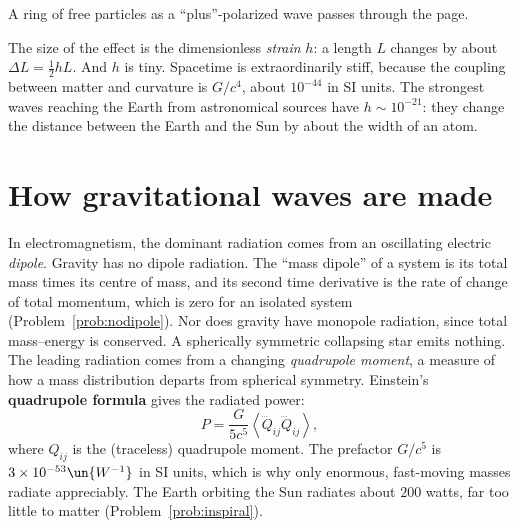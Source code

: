 \begin{center}

{\small A ring of free particles as a ``plus''-polarized wave passes through the page.}
\end{center}

The size of the effect is the dimensionless \emph{strain} $h$: a length $L$ changes by about $\Delta L = \tfrac12hL$. And $h$ is tiny. Spacetime is extraordinarily stiff, because the coupling between matter and curvature is $G/c^4$, about $10^{-44}$ in SI units. The strongest waves reaching the Earth from astronomical sources have $h\sim10^{-21}$: they change the distance between the Earth and the Sun by about the width of an atom.

\section{How gravitational waves are made}

In electromagnetism, the dominant radiation comes from an oscillating electric \emph{dipole}. Gravity has no dipole radiation. The ``mass dipole'' of a system is its total mass times its centre of mass, and its second time derivative is the rate of change of total momentum, which is zero for an isolated system (Problem~\ref{prob:nodipole}). Nor does gravity have monopole radiation, since total mass--energy is conserved. A spherically symmetric collapsing star emits nothing. The leading radiation comes from a changing \emph{quadrupole moment}, a measure of how a mass distribution departs from spherical symmetry. Einstein's \textbf{quadrupole formula} gives the radiated power:
\[
  P = \frac{G}{5c^5}\left\langle\dddot Q_{ij}\dddot Q_{ij}\right\rangle,
\]
where $Q_{ij}$ is the (traceless) quadrupole moment. The prefactor $G/c^5$ is $3\times10^{-53}\un{W^{-1}}$ in SI units, which is why only enormous, fast-moving masses radiate appreciably. The Earth orbiting the Sun radiates about $200$ watts, far too little to matter (Problem~\ref{prob:inspiral}).

